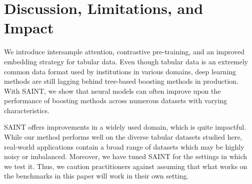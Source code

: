 \documentclass{article}
\begin{document}
\section{Discussion, Limitations, and Impact}
\label{sec:discussion}
We introduce intersample attention, contrastive pre-training, and an improved embedding strategy for tabular data. Even though tabular data is an extremely common data format used by institutions in various domains, deep learning methods are still lagging behind tree-based boosting methods in production. With SAINT, we show that neural models can often improve upon the performance of boosting methods across numerous datasets with varying characteristics.

SAINT offers improvements in a widely used domain, which is quite impactful. While our method performs well on the diverse tabular datasets studied here, real-world applications contain a broad range of datasets which may be highly noisy or imbalanced.  Moreover, we have tuned SAINT for the settings in which we test it.  Thus, we caution practitioners against assuming that what works on the benchmarks in this paper will work in their own setting.

{
\small


}

\newpage




\end{document}
